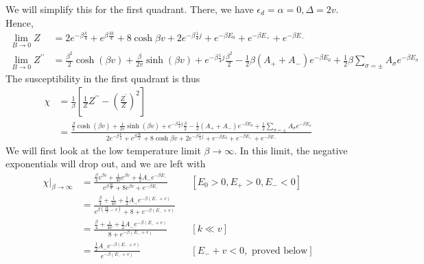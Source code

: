 \documentclass[12pt,twoside]{report}
\numberwithin{equation}{section}
\begin{document}
{We will simplify this for the first quadrant. There, we have \(\epsilon_d = \alpha = 0, \Delta = 2v\). Hence,
\begin{equation}\begin{aligned}
	\lim_{B \to 0}Z &= 2 e^{-\beta \frac{k}{4}} + e^{\beta \frac{3k}{4}} + 8\cosh{\beta v} + 2e^{-\beta\frac{1}{4}j } + e^{-\beta E_0} + e^{-\beta E_+} + e^{-\beta E_-}\\
	\lim_{B \to 0}Z^{\prime \prime} &= \frac{\beta^2}{2} \cosh (\beta v) + \frac{\beta}{2v} \sinh(\beta v) + e^{-\beta\frac{1}{4}j}\frac{\beta^2}{2} - \frac{1}{2}\beta\left(A_+ + A_-\right)e^{-\beta E_0} + \frac{1}{2}\beta\sum_{\sigma=\pm}A_\sigma e^{-\beta E_\sigma}
\end{aligned}\end{equation}
The susceptibility in the first quadrant is thus
\begin{equation}\begin{aligned}
	\chi &= \frac{1}{\beta}\left[\frac{1}{Z}Z^{\prime\prime} - \left( \frac{Z^\prime}{Z} \right) ^2\right]\\
	     &= \frac{\frac{\beta}{2} \cosh (\beta v) + \frac{1}{2v} \sinh(\beta v) + e^{-\beta\frac{1}{4}j}\frac{\beta}{2} - \frac{1}{2}\left(A_+ + A_-\right)e^{-\beta E_0} + \frac{1}{2}\sum_{\sigma=\pm}A_\sigma e^{-\beta E_\sigma}}{2 e^{-\beta \frac{k}{4}} + e^{\beta \frac{3k}{4}} + 8\cosh{\beta v} + 2e^{-\beta\frac{1}{4}j } + e^{-\beta E_0} + e^{-\beta E_+} + e^{-\beta E_-}}
\end{aligned}\end{equation}
We will first look at the low temperature limit \(\beta \to \infty\). In this limit, the negative exponentials will drop out, and we are left with
\begin{equation}\begin{aligned}
	\chi\big\vert_{\beta \to \infty} &= \frac{\frac{\beta}{4} e^{\beta v} + \frac{1}{4v} e^{\beta v} + \frac{1}{2}A_- e^{-\beta E_-}}{e^{\beta \frac{3k}{4}} + 8e^{\beta v} + e^{-\beta E_-}} && [E_0 > 0, E_+ > 0, E_-<0]\\
					 &= \frac{\frac{\beta}{4}  + \frac{1}{4v}  + \frac{1}{2}A_- e^{-\beta \left(E_- + v\right)}}{e^{\beta \left(\frac{3k}{4} - v\right)} + 8 + e^{-\beta \left(E_- + v\right)}}\\
					 &= \frac{\frac{\beta}{4}  + \frac{1}{4v}  + \frac{1}{2}A_- e^{-\beta \left(E_- + v\right)}}{8 + e^{-\beta \left(E_- + v\right)}} && \left[k \ll v\right] \\
					 &= \frac{\frac{1}{2}A_- e^{-\beta \left(E_- + v\right)}}{e^{-\beta \left(E_- + v\right)}} && \left[E_-+v < 0, \text{ proved below}\right] \\

\end{aligned}
\end{equation}}
\end{document}
